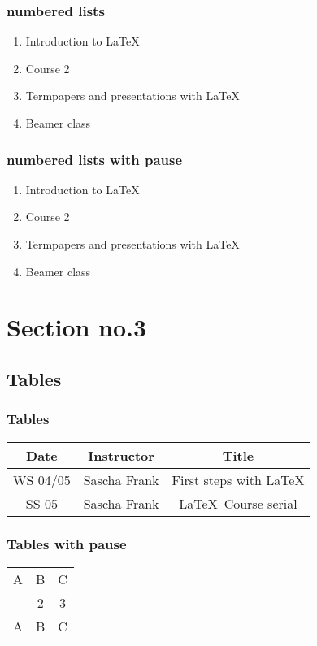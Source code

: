 \documentclass{beamer}
\begin{document}
\begin{frame}\frametitle{numbered lists}
\begin{enumerate}
\item Introduction to  \LaTeX  
\item Course 2 
\item Termpapers and presentations with \LaTeX 
\item Beamer class
\end{enumerate}
\end{frame}

\begin{frame}\frametitle{numbered lists with pause}
\begin{enumerate}
\item Introduction to  \LaTeX \pause 
\item Course 2 \pause 
\item Termpapers and presentations with \LaTeX \pause 
\item Beamer class
\end{enumerate}
\end{frame}

\section{Section no.3} 
\subsection{Tables}
\begin{frame}\frametitle{Tables}
\begin{tabular}{|c|c|c|}
\hline
\textbf{Date} & \textbf{Instructor} & \textbf{Title} \\
\hline
WS 04/05 & Sascha Frank & First steps with  \LaTeX  \\
\hline
SS 05 & Sascha Frank & \LaTeX \ Course serial \\
\hline
\end{tabular}
\end{frame}


\begin{frame}\frametitle{Tables with pause}
\begin{tabular}{c c c}
A & B & C \\ 
\pause 
1 & 2 & 3 \\  
\pause 
A & B & C \\ 
\end{tabular} 
\end{frame}
\end{document}

